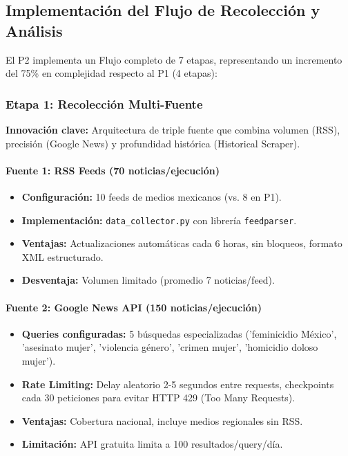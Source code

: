 \subsection{Implementación del Flujo de Recolección y Análisis}
\label{subsec:p2_pipeline}

El P2 implementa un Flujo completo de 7 etapas, representando un incremento del 75\% en complejidad respecto al P1 (4 etapas):

\subsubsection{Etapa 1: Recolección Multi-Fuente}

\textbf{Innovación clave:} Arquitectura de triple fuente que combina volumen (RSS), precisión (Google News) y profundidad histórica (Historical Scraper).

\paragraph{Fuente 1: RSS Feeds (70 noticias/ejecución)}
\begin{itemize}
    \item \textbf{Configuración:} 10 feeds de medios mexicanos (vs. 8 en P1).
    \item \textbf{Implementación:} \texttt{data\_collector.py} con librería \texttt{feedparser}.
    \item \textbf{Ventajas:} Actualizaciones automáticas cada 6 horas, sin bloqueos, formato XML estructurado.
    \item \textbf{Desventaja:} Volumen limitado (promedio 7 noticias/feed).
\end{itemize}

\paragraph{Fuente 2: Google News API (150 noticias/ejecución)}
\begin{itemize}
    \item \textbf{Queries configuradas:} 5 búsquedas especializadas ('feminicidio México', 'asesinato mujer', 'violencia género', 'crimen mujer', 'homicidio doloso mujer').
    \item \textbf{Rate Limiting:} Delay aleatorio 2-5 segundos entre requests, checkpoints cada 30 peticiones para evitar HTTP 429 (Too Many Requests).
    \item \textbf{Ventajas:} Cobertura nacional, incluye medios regionales sin RSS.
    \item \textbf{Limitación:} API gratuita limita a 100 resultados/query/día.
\end{itemize}

